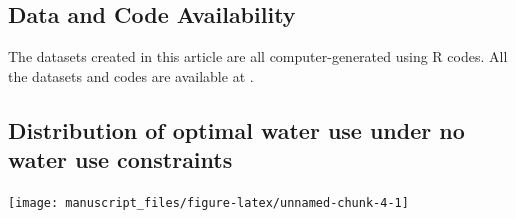 \documentclass[
]{article}
\begin{document}
\subsection{Data and Code Availability}\label{data-and-code-availability}

The datasets created in this article are all computer-generated using R codes. All the datasets and codes are available at .

\clearpage

\appendix


\subsection{Distribution of optimal water use under no water use constraints}\label{distribution-of-optimal-water-use-under-no-water-use-constraints}

\begin{center}\texttt{[image: manuscript\_files/figure-latex/unnamed-chunk-4-1]} \end{center}

  
\end{document}
